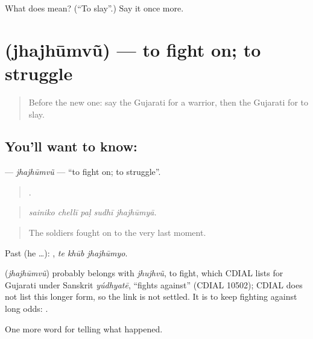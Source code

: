 \begin{tcolorbox}[breakable,colback=teal!4,colframe=teal!35!black,title={Before you move on}]
What does  mean? (\textquotedblleft{}To slay\textquotedblright{}.) Say it once more.
\end{tcolorbox}
\section[\texorpdfstring{\gu{ઝઝૂમવું} (jhajhūmvũ)}{ઝઝૂમવું (jhajhūmvũ)}]{ (jhajhūmvũ) — to fight on; to struggle}

\label{lesson:GU-C322-jhajhumvu}



\begin{quote}
Before the new one: say the Gujarati for a warrior, then the Gujarati for to slay.
\end{quote}

\subsection*{You'll want to know: }
\textbf{} — \emph{jhajhūmvũ} — \textquotedblleft{}to fight on; to struggle\textquotedblright{}.

\begin{quote}
    .
\end{quote}

\begin{quote}
\emph{sainiko chellī paḷ sudhī jhajhūmyā.}
\end{quote}

\begin{quote}
The soldiers fought on to the very last moment.
\end{quote}

Past (he …):   , \emph{te khūb jhajhūmyo}.

\begin{cousinweb}
\textbf{} (\emph{jhajhūmvũ}) probably belongs with \emph{jhujhvũ}, to fight, which CDIAL lists for Gujarati under Sanskrit \emph{yúdhyatē}, \textquotedblleft{}fights against\textquotedblright{} (CDIAL 10502); CDIAL does not list this longer form, so the link is not settled. It is to keep fighting against long odds: \textbf{   }.
\end{cousinweb}

\begin{grammarlens}[title={What you've built}]
One more word for telling what happened.
\end{grammarlens}

